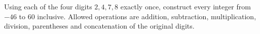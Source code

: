 Using each of the four digits $2,4,7,8$ exactly once, construct every integer from $-46$ to $60$ inclusive. Allowed operations are addition, subtraction, multiplication, division, parentheses and concatenation of the original digits.
